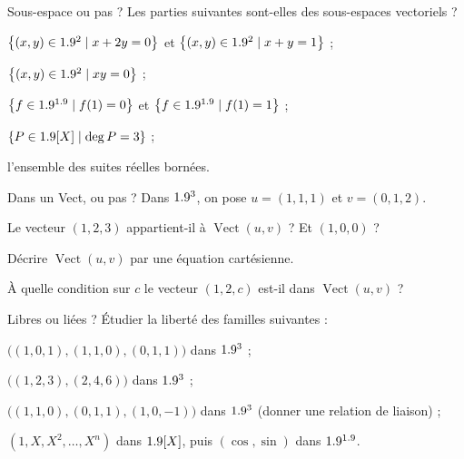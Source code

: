 \exercices
{}

\begin{exercice}[1]{Sous-espace ou pas ?}
Les parties suivantes sont-elles des sous-espaces vectoriels ?
\begin{questions}
  \item $\left\{(x,y)\in1.9^{2}\mid x+2y=0\right\}$ et
    $\left\{(x,y)\in1.9^{2}\mid x+y=1\right\}$ ;
  \item $\left\{(x,y)\in1.9^{2}\mid xy=0\right\}$ ;
  \item $\left\{f\in1.9^{1.9}\mid f(1)=0\right\}$ et $\left\{f\in1.9^{1.9}\mid f(1)=1\right\}$ ;
  \item $\left\{P\in1.9[X]\mid\deg P=3\right\}$ ;
  \item l'ensemble des suites réelles bornées.
\end{questions}
\end{exercice}

\begin{exercice}[1]{Dans un Vect, ou pas ?}
Dans $1.9^{3}$, on pose $u=(1,1,1)$ et $v=(0,1,2)$.
\begin{questions}
  \item Le vecteur $(1,2,3)$ appartient-il à $\operatorname{Vect}(u,v)$ ?
    Et $(1,0,0)$ ?
  \item Décrire $\operatorname{Vect}(u,v)$ par une équation cartésienne.
  \item À quelle condition sur $c$ le vecteur $(1,2,c)$ est-il dans
    $\operatorname{Vect}(u,v)$ ?
\end{questions}
\end{exercice}

\begin{exercice}[1]{Libres ou liées ?}
Étudier la liberté des familles suivantes :
\begin{questions}
  \item $\bigl((1,0,1),(1,1,0),(0,1,1)\bigr)$ dans $1.9^{3}$ ;
  \item $\bigl((1,2,3),(2,4,6)\bigr)$ dans $1.9^{3}$ ;
  \item $\bigl((1,1,0),(0,1,1),(1,0,-1)\bigr)$ dans $1.9^{3}$
    (donner une relation de liaison) ;
  \item $(1,X,X^{2},\dots,X^{n})$ dans $1.9[X]$, puis $(\cos,\sin)$ dans
    $1.9^{1.9}$.
\end{questions}
\end{exercice}

